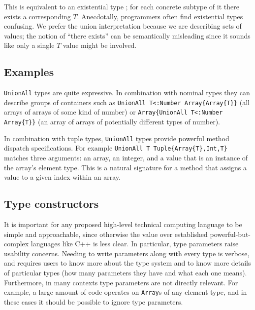 This is equivalent to an existential type \cite{boundedquant};
for each concrete subtype of it there exists a corresponding $T$.
Anecdotally, programmers often find existential types confusing.
We prefer the union interpretation because we are describing sets of values;
the notion of ``there exists'' can be semantically misleading since it sounds like
only a single $T$ value might be involved.



\subsection{Examples}

\texttt{UnionAll} types are quite expressive. In combination with nominal
types they can describe groups of containers such as
\texttt{UnionAll T<:Number Array\{Array\{T\}\}} (all arrays of arrays of
some kind of number) or
\texttt{Array\{UnionAll T<:Number Array\{T\}\}} (an array of arrays of
potentially different types of number).

In combination with tuple types, \texttt{UnionAll} types provide powerful
method dispatch specifications. For example
\texttt{UnionAll T Tuple\{Array\{T\},Int,T\}} matches three arguments:
an array, an integer, and a value that is an instance of the array's
element type. This is a natural signature for a method that assigns a
value to a given index within an array.


\subsection{Type constructors}

It is important for any proposed high-level technical computing language to be
simple and approachable, since otherwise the value over established
powerful-but-complex languages like C++ is less clear.
In particular, type parameters raise usability concerns.
Needing to write parameters along with every type is verbose, and requires users
to know more about the type system and to know more details of particular
types (how many parameters they have and what each one means).
Furthermore, in many contexts type parameters are not directly relevant.
For example, a large amount of code operates on \texttt{Array}s of any
element type, and in these cases it should be possible to ignore type parameters.

